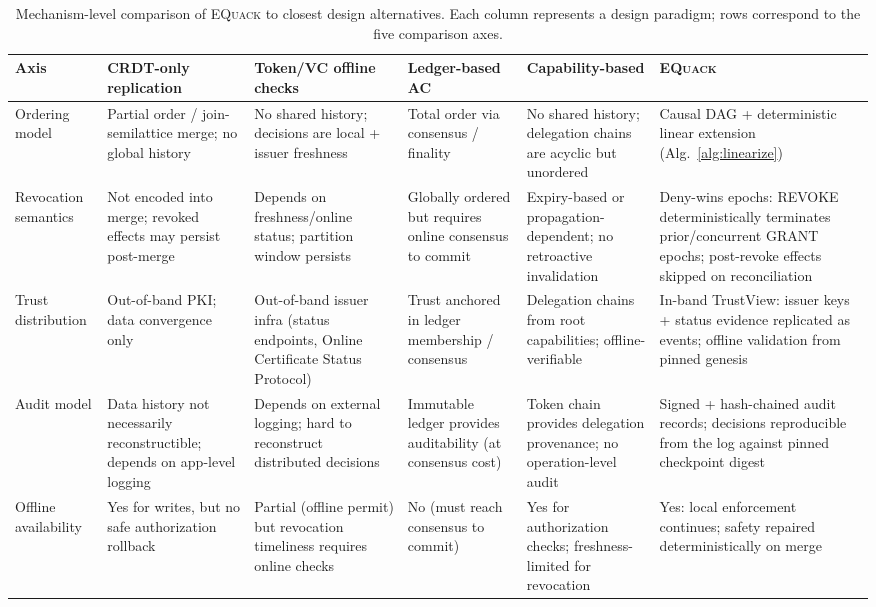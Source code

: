 \documentclass[10pt,journal,compsoc]{IEEEtran}
\newcommand{\equack}{\textsc{EQuack}}
\begin{document}
\begin{table}[!t]
\centering
\caption{Mechanism-level comparison of \equack{} to closest design alternatives. Each column represents a design paradigm; rows correspond to the five comparison axes.}
\label{tab:mech-compare}
\footnotesize
\setlength{\tabcolsep}{4pt}
\renewcommand{\arraystretch}{1.25}
\begin{tabular}{p{1.6cm} p{2.4cm} p{2.4cm} p{2.4cm} p{2.4cm} p{3.0cm}}
\toprule
\textbf{Axis} & \textbf{CRDT-only replication} & \textbf{Token/VC offline checks} & \textbf{Ledger-based AC} & \textbf{Capability-based} & \textbf{\equack{}} \\
\midrule
Ordering model &
  Partial order / join-semilattice merge; no global history &
  No shared history; decisions are local + issuer freshness &
  Total order via consensus / finality &
  No shared history; delegation chains are acyclic but unordered &
  Causal DAG + deterministic linear extension (Alg.~\ref{alg:linearize}) \\
\addlinespace
Revocation semantics &
  Not encoded into merge; revoked effects may persist post-merge &
  Depends on freshness/online status; partition window persists &
  Globally ordered but requires online consensus to commit &
  Expiry-based or propagation-dependent; no retroactive invalidation &
  Deny-wins epochs: REVOKE deterministically terminates prior/concurrent GRANT epochs; post-revoke effects skipped on reconciliation \\
\addlinespace
Trust distribution &
  Out-of-band PKI; data convergence only &
  Out-of-band issuer infra (status endpoints, Online Certificate Status Protocol) &
  Trust anchored in ledger membership / consensus &
  Delegation chains from root capabilities; offline-verifiable &
  In-band TrustView: issuer keys + status evidence replicated as events; offline validation from pinned genesis \\
\addlinespace
Audit model &
  Data history not necessarily reconstructible; depends on app-level logging &
  Depends on external logging; hard to reconstruct distributed decisions &
  Immutable ledger provides auditability (at consensus cost) &
  Token chain provides delegation provenance; no operation-level audit &
  Signed + hash-chained audit records; decisions reproducible from the log against pinned checkpoint digest \\
\addlinespace
Offline availability &
  Yes for writes, but no safe authorization rollback &
  Partial (offline permit) but revocation timeliness requires online checks &
  No (must reach consensus to commit) &
  Yes for authorization checks; freshness-limited for revocation &
  Yes: local enforcement continues; safety repaired deterministically on merge \\
\bottomrule
\end{tabular}
\end{table}
\end{document}
